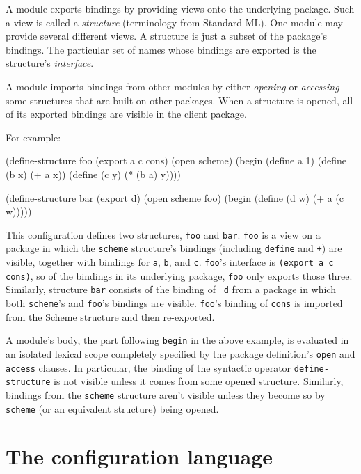 A module exports bindings by providing views onto the underlying
package.  Such a view is called a {\em structure} (terminology from
Standard ML).  One module may provide several different views.  A
structure is just a subset of the package's bindings.  The particular
set of names whose bindings are exported is the structure's {\em
interface}.

A module imports bindings from other modules by either {\em opening}
or {\em accessing} some structures that are built on other packages.
When a structure is opened, all of its exported bindings are visible
in the client package.

For example:
\begin{example}
(define-structure foo (export a c cons)
  (open scheme)
  (begin (define a 1)
         (define (b x) (+ a x))
         (define (c y) (* (b a) y))))

(define-structure bar (export d)
  (open scheme foo)
  (begin (define (d w) (+ a (c w)))))
\end{example}
This configuration defines two structures, {\tt foo} and {\tt bar}.
{\tt foo} is a view on a package in which the {\tt scheme} structure's
bindings (including {\tt define} and {\tt +}) are visible, together
with bindings for {\tt a}, {\tt b},
and {\tt c}.  {\tt foo}'s interface is {\tt (export a c cons)}, so of
the bindings in its underlying package, {\tt foo} only exports those
three.  Similarly, structure {\tt bar} consists of the binding of {\tt
d} from a package in which both {\tt scheme}'s and {\tt foo}'s
bindings are visible.  {\tt foo}'s binding of {\tt cons} is imported
from the Scheme structure and then re-exported.

A module's body, the part following {\tt begin} in the above example,
is evaluated in an isolated lexical scope completely specified by the
package definition's {\tt open} and {\tt access} clauses.  In
particular, the binding of the syntactic operator {\tt define-structure}
is not visible unless it comes from some opened structure.  Similarly,
bindings from the {\tt scheme} structure aren't visible unless they
become so by {\tt scheme} (or an equivalent structure) being opened.


\section{The configuration language}

